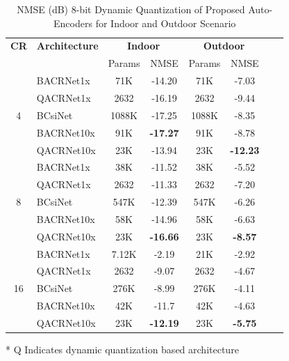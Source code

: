\documentclass[lettersize,journal]{IEEEtran}
\begin{document}
\begin{table}[ht]
	\centering
	\caption{NMSE (dB) 8-bit Dynamic Quantization of Proposed Auto-Encoders for Indoor and Outdoor Scenario}
	\label{table:dynamicquantization}
	\begin{threeparttable}
		\begin{tabular}{clcccccc}
			\toprule
			\textbf{CR} & \textbf{Architecture} & \multicolumn{2}{c}{\textbf{Indoor}} & \multicolumn{2}{c}{\textbf{Outdoor}} \\ 
			& & Params & NMSE & Params & NMSE \\ 
			\midrule
			\multirow{5}{*}{4} & BACRNet1x\cite{abx} & 71K & -14.20 & 71K & -7.03 \\  
			& QACRNet1x & 2632 & -16.19 & 2632 & -9.44 \\  
			& BCsiNet\cite{abp} & 1088K & -17.25 & 1088K & -8.35 \\ 
			& BACRNet10x\cite{abx} & 91K & \textbf{-17.27} & 91K & -8.78 \\ 
			& QACRNet10x & 23K & -13.94 & 23K & \textbf{-12.23} \\ 
			\midrule
			\multirow{5}{*}{8} & BACRNet1x\cite{abx} & 38K & -11.52 & 38K & -5.52 \\  
			& QACRNet1x & 2632 & -11.33 & 2632 & -7.20 \\  
			& BCsiNet\cite{abp} & 547K & -12.39 & 547K & -6.26 \\ 
			& BACRNet10x\cite{abx} & 58K & -14.96 & 58K & -6.63 \\ 
			& QACRNet10x & 23K & \textbf{-16.66} & 23K & \textbf{-8.57} \\ 
			\midrule
			\multirow{5}{*}{16} & BACRNet1x\cite{abx} & 7.12K & -2.19 & 21K & -2.92 \\  
			& QACRNet1x & 2632 & -9.07 & 2632 & -4.67 \\  
			& BCsiNet\cite{abp} & 276K & -8.99 & 276K & -4.11 \\ 
			& BACRNet10x\cite{abx} & 42K & -11.7 & 42K & -4.63 \\ 
			& QACRNet10x & 23K & \textbf{-12.19} & 23K & \textbf{-5.75} \\ 
			\bottomrule
		\end{tabular}
		\begin{tablenotes}
			\item[*] Q Indicates dynamic quantization based architecture 
		\end{tablenotes}
	\end{threeparttable}
\end{table}
\end{document}
